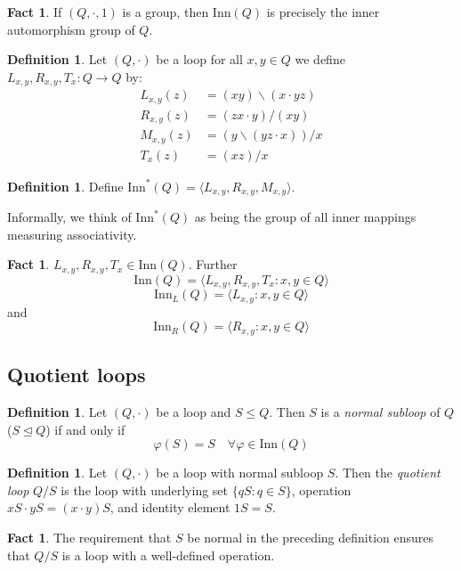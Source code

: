 \documentclass[12pt]{report}
\theoremstyle{definition}
\newtheorem{fct}[thm]{Fact}
\newtheorem{dfn}[thm]{Definition}
\newcommand{\ldv}{\backslash}       %
\newcommand{\rdv}{/}                %
\newcommand{\inn}{\text{Inn}}       %
\begin{document}
\begin{fct}
  If $(Q, \cdot, 1)$ is a group, then $\inn(Q)$ is precisely the inner automorphism group of $Q$.
\end{fct}

\begin{dfn}
  Let $(Q, \cdot)$ be a loop for all $x, y\in Q$ we define $L_{x, y}, R_{x, y}, T_x: Q\to Q$ by:
  \begin{align*}
    L_{x, y}(z) &= (xy)\ldv(x\cdot yz)\\
    R_{x, y}(z) &= (zx\cdot y)\rdv(xy)\\
    M_{x, y}(z) &= (y\ldv(yz\cdot x))\rdv x\\
    T_x(z) &= (xz)\rdv x
  \end{align*}
\end{dfn}

\begin{dfn}
  Define $\inn^*(Q) = \langle L_{x, y}, R_{x, y}, M_{x, y}\rangle$.\
\end{dfn}

Informally, we think of $\inn^*(Q)$ as being the group of all inner mappings measuring associativity.

\begin{fct}
  $L_{x, y}, R_{x, y}, T_x\in \inn(Q)$. Further
  \[\inn(Q) = \langle L_{x, y}, R_{x, y}, T_x : x, y\in Q\rangle\]
  \[\inn_L(Q) = \langle L_{x, y} : x, y\in Q\rangle\] and
  \[\inn_R(Q) = \langle R_{x, y} : x, y\in Q\rangle\]
\end{fct}

\subsection{Quotient loops}

\begin{dfn}
  Let $(Q, \cdot)$ be a loop and $S\leq Q$. Then $S$ is a \emph{normal subloop} of $Q$ ($S\unlhd Q$) if and only if
  \[\varphi(S) = S\quad\forall\varphi\in \inn(Q)\]
\end{dfn}

\begin{dfn}
  Let $(Q, \cdot)$ be a loop with normal subloop $S$. Then the \emph{quotient loop} $Q/S$ is the loop with underlying
    set $\{qS : q\in S\}$, operation $xS\cdot yS = (x\cdot y) S$, and identity element $1S = S$.
\end{dfn}

\begin{fct}
  The requirement that $S$ be normal in the preceding definition ensures that $Q/S$ is a loop with a well-defined operation.
\end{fct}
\end{document}
